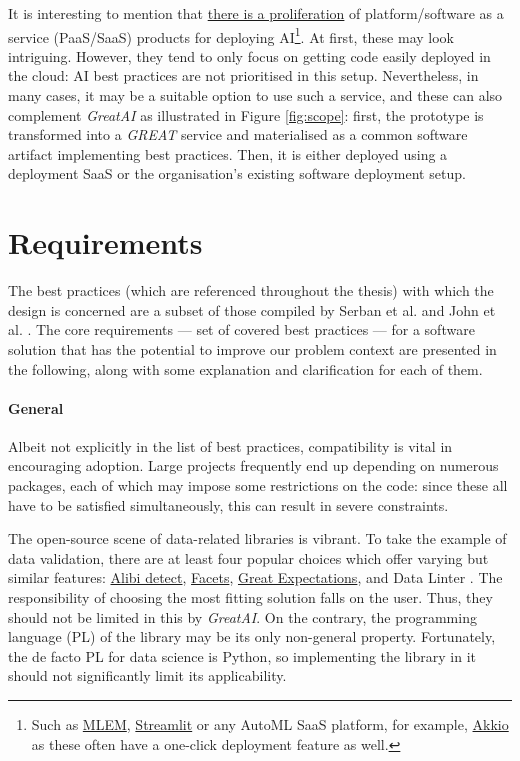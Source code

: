 It is interesting to mention that \href{https://xkcd.com/927/}{there is a proliferation} of platform/software as a service (PaaS/SaaS) products for deploying AI\footnote{Such as \href{https://mlem.ai/}{MLEM}, \href{https://streamlit.io/cloud}{Streamlit} or any AutoML SaaS platform, for example, \href{https://www.akkio.com/role/software-engineers}{Akkio} as these often have a one-click deployment feature as well.}. At first, these may look intriguing. However, they tend to only focus on getting code easily deployed in the cloud: AI best practices are not prioritised in this setup. Nevertheless, in many cases, it may be a suitable option to use such a service, and these can also complement \textit{GreatAI} as illustrated in Figure \ref{fig:scope}: first, the prototype is transformed into a \textit{GREAT} service and materialised as a common software artifact implementing best practices. Then, it is either deployed using a deployment SaaS or the organisation's existing software deployment setup.

\section{Requirements} \label{section:requirements}

The best practices (which are referenced throughout the thesis) with which the design is concerned are a subset of those compiled by Serban et al. \cite{serban2020adoption,serban2021practices} and John et al. \cite{john2020architecting}. The core requirements --- set of covered best practices --- for a software solution that has the potential to improve our problem context are presented in the following, along with some explanation and clarification for each of them.

\paragraph{General} Albeit not explicitly in the list of best practices, compatibility is vital in encouraging adoption. Large projects frequently end up depending on numerous packages, each of which may impose some restrictions on the code: since these all have to be satisfied simultaneously, this can result in severe constraints. 

The open-source scene of data-related libraries is vibrant. To take the example of data validation, there are at least four popular choices which offer varying but similar features: \href{https://github.com/SeldonIO/alibi-detect}{Alibi detect}, \href{https://github.com/PAIR-code/facets}{Facets}, \href{https://github.com/great-expectations/great_expectations}{Great Expectations}, and Data Linter \cite{hynes2017data}. The responsibility of choosing the most fitting solution falls on the user. Thus, they should not be limited in this by \textit{GreatAI}. On the contrary, the programming language (PL) of the library may be its only non-general property. Fortunately, the de facto PL for data science is Python, so implementing the library in it should not significantly limit its applicability.

